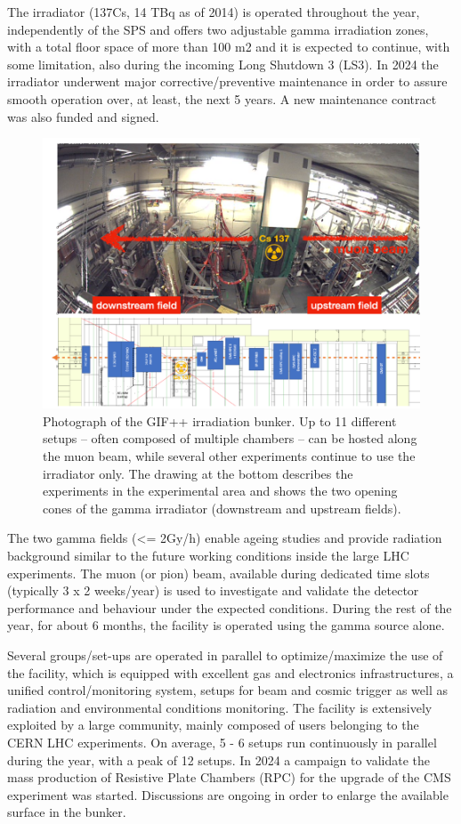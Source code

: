 The irradiator (137Cs, 14 TBq as of 2014) is operated throughout the year, independently of 
the SPS and offers two adjustable gamma irradiation zones, with a total floor space of more than 100 m2 and it is expected to continue, with some limitation, also during the incoming Long Shutdown 3 (LS3). In 2024 the irradiator underwent major corrective/preventive maintenance in order to assure smooth operation over, at least, the next 5 years. A new maintenance contract was also funded and signed. 

\begin{figure}[!h]
    \centering
    \includegraphics[width=0.75\linewidth]{image8.png}
    \caption{Photograph of the GIF++ irradiation bunker. Up to 11 different setups – often composed of multiple chambers – can be hosted along the muon beam, while several other experiments continue to use the irradiator only. The drawing at the bottom describes the experiments in the experimental area and shows the two opening cones of the gamma irradiator (downstream and upstream fields). }
    \label{fig:4.3.2}
\end{figure}

The two gamma fields (<= 2Gy/h) enable ageing studies and provide radiation background similar to the future working conditions inside the large LHC experiments. The muon (or pion) beam, available during dedicated time slots (typically 3 x 2 weeks/year) is used to investigate and validate the detector performance and behaviour under the expected conditions. During the rest of the year, for about 6 months, the facility is operated using the gamma source alone.

Several groups/set-ups are operated in parallel to optimize/maximize the use of the facility, which is equipped with excellent gas and electronics infrastructures, a unified control/monitoring system, setups for beam and cosmic trigger as well as radiation and environmental conditions monitoring.
The facility is extensively exploited by a large community, mainly composed of users belonging to the CERN LHC experiments. On average, 5 - 6 setups run continuously in parallel during the year, with a peak of 12 setups. In 2024 a campaign to validate the mass production of Resistive Plate Chambers (RPC) for the upgrade of the CMS experiment was started. Discussions are ongoing in order to enlarge the available surface in the bunker.

